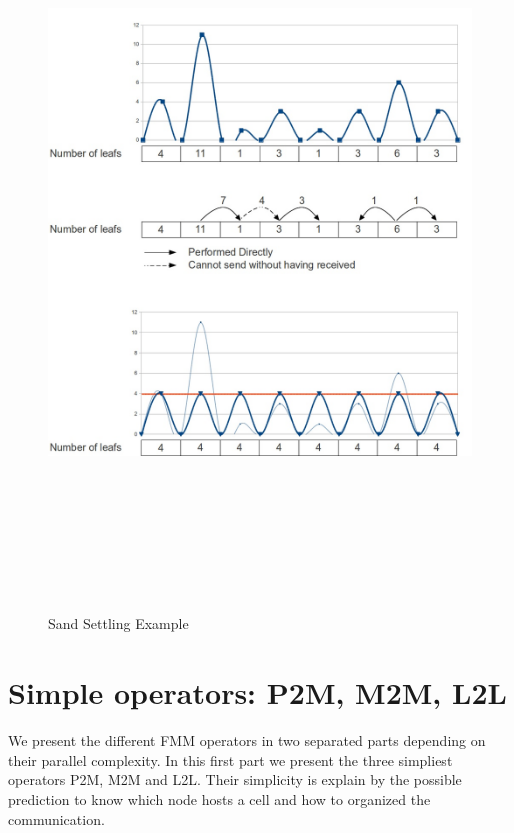 \documentclass[10pt,letterpaper,titlepage]{report}
\begin{document}
\begin{figure}[h!]
\begin{center}
\includegraphics[width=15cm, height=20cm, keepaspectratio=true]{SandSettling.png} 
\caption{Sand Settling Example}
\end{center}
\end{figure}


\chapter{Simple operators: P2M, M2M, L2L}
We present the different FMM operators in two separated parts depending on their parallel complexity.
In this first part we present the three simpliest operators P2M, M2M and L2L.
Their simplicity is explain by the possible prediction to know which node hosts a cell and how to organized the communication.
\end{document}
